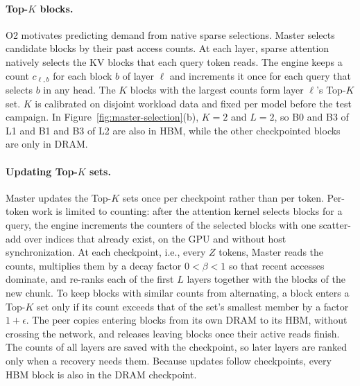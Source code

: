 \paragraph{Top-$K$ blocks.}
O2 motivates predicting demand from native sparse selections. Master
selects candidate blocks by their past access counts. At each layer, sparse
attention natively selects the KV blocks that each query token reads. The
engine keeps a count $c_{\ell,b}$ for each block $b$ of layer $\ell$ and
increments it once for each query that selects $b$ in any head. The $K$ blocks with the largest counts form
layer $\ell$'s Top-$K$ set. $K$ is calibrated on disjoint workload data
and fixed per model before the test campaign. In Figure~\ref{fig:master-selection}(b),
$K=2$ and $L=2$, so B0 and B3 of L1 and B1 and B3 of L2 are also in HBM,
while the other checkpointed blocks are only in DRAM.

\paragraph{Updating Top-$K$ sets.}
Master updates the Top-$K$ sets once per checkpoint rather than per
token. Per-token work is limited to counting: after the attention kernel
selects blocks for a query, the engine increments the counters of the
selected blocks with one scatter-add over indices that already exist, on
the GPU and without host synchronization. At each checkpoint, i.e., every
$Z$ tokens, Master reads the counts, multiplies them by a decay factor
$0<\beta<1$ so that recent accesses dominate, and re-ranks each of the
first $L$ layers together with the blocks of the new chunk. To keep blocks
with similar counts from alternating, a block enters a Top-$K$ set only if
its count exceeds that of the set's smallest member by a factor $1+\epsilon$.
The peer copies entering blocks from its own DRAM to its HBM, without
crossing the network, and releases leaving blocks once their active reads
finish. The counts of all layers are saved with the checkpoint, so later
layers are ranked only when a recovery needs them. Because updates follow
checkpoints, every HBM block is also in the DRAM checkpoint.

